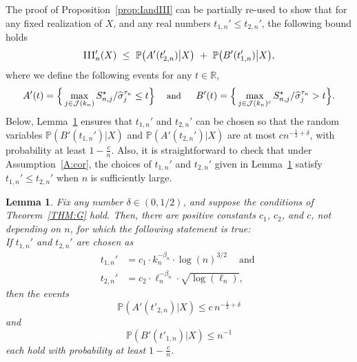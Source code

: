 \documentclass[aos,preprint]{imsart}
\numberwithin{equation}{section}
\theoremstyle{plain}
\newtheorem{lemma}{Lemma}[section]
\newcommand{\R}{\mathbb{R}}
\renewcommand{\hat}[1]{\widehat{#1}}
\newcommand{\III}{\textsc{III}}
\newcommand{\J}{\mathcal{J}}
\renewcommand{\P}{\mathbb{P}}
\newcommand{\1}{{\bf{1}}}
\newcommand{\0}{\mathbf{0}}
\begin{document}
The proof of Proposition~\ref{prop:IandIII} can be partially re-used to show that for any fixed realization of $X$, and any real numbers $t_{1,n}'\leq t_{2,n}'$, the following bound holds
\begin{equation}
%
\III_n'(X) \ \leq \ \P\big(A'(t_{2,n}')\big| X\big) \ + \ \P\big(B'(t_{1,n}')\big| X\big),
\end{equation}
where we define the following events for any $t\in\R$,
\begin{equation}\label{inclusionboot}
\small
A'(t)=\Big\{\max_{j\in\J(k_n)} S^{\star}_{n,j}/\hat \sigma_j^{\tau_n}\leq t\Big\} \ \ \ \text{ and } \ \  \ \ B'(t)=\Big\{\max_{j\in\J(k_n)^c} S^{\star}_{n,j}/\hat \sigma_j^{\tau_n}> t\Big\}.
\end{equation} 
Below, Lemma~\ref{lem:Bboundboot} ensures that $t_{1,n}'$ and $t_{2,n}'$ can be chosen so that 
%
the random variables $\P(B'(t_{1,n}')\big|X)$ and $\P(A'(t_{2,n}')\big|X)$ are at most $c n^{-\frac 12+\delta}$, with probability at least $1-\frac cn$. Also, it is straightforward to check that under Assumption~\ref{A:cor}, the choices of $t_{1,n}'$ and  $t_{2,n}'$ given in Lemma~\ref{lem:Bboundboot} satisfy $t_{1,n}'\leq t_{2,n}'$ when $n$ is sufficiently large.


\begin{lemma}\label{lem:Bboundboot}
Fix any number $\delta\in(0,1/2)$, and suppose the conditions of Theorem~\ref{THM:G} hold. Then, there are positive constants $c_1$, $c_2$, and $c$, not depending on $n$,  for which the following statement is true: \\[-0.3cm]

If $t_{1,n}'$ and $t_{2,n}'$ are chosen as
\begin{align}
 t_{1,n}' &= c_1\cdot k_n^{-\beta_n}\cdot\log(n)^{3/2}   \ \ \ \ \text{ and }
 \label{eqn:t1prime}\\[0.2cm]
 t_{2,n}' &=c_2\cdot \ell_n^{-\beta_n}\cdot\sqrt{\log(\ell_n)},
%
\label{eqn:t2prime}
\end{align}
then the events
\begin{equation}\label{abound}\tag{a}
\P(A'(t'_{2,n})\big|X) \leq c\, n^{-\frac 12+\delta}
\end{equation}
and
\begin{equation}\label{bbound}\tag{b}
\P(B'(t'_{1,n})\big| X) \leq n^{-1}
\end{equation}
each hold with probability at least $1-\frac cn$.
%
%
%
\end{lemma}
\end{document}
